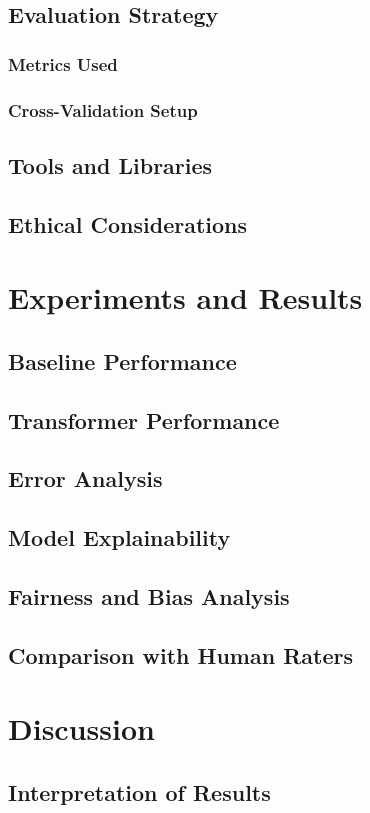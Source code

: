 \documentclass[12pt]{report}
\begin{document}
\section{Evaluation Strategy}
\subsection{Metrics Used}
\subsection{Cross-Validation Setup}
\section{Tools and Libraries}
\section{Ethical Considerations}

\chapter{Experiments and Results}
\section{Baseline Performance}
\section{Transformer Performance}
\section{Error Analysis}
\section{Model Explainability}
\section{Fairness and Bias Analysis}
\section{Comparison with Human Raters}

\chapter{Discussion}
\section{Interpretation of Results}
\end{document}
